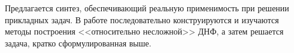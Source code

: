 \documentclass[12pt,a4paper,oneside,fleqn,leqno]{article}
\theoremstyle{definition}
\begin{document}
	Предлагается синтез, обеспечивающий реальную применимость при решении прикладных задач. В работе последовательно конструируются и изучаются методы построения <<относительно несложной>> ДНФ, а затем решается задача, кратко сформулированная выше.\par


 

\end{document}
